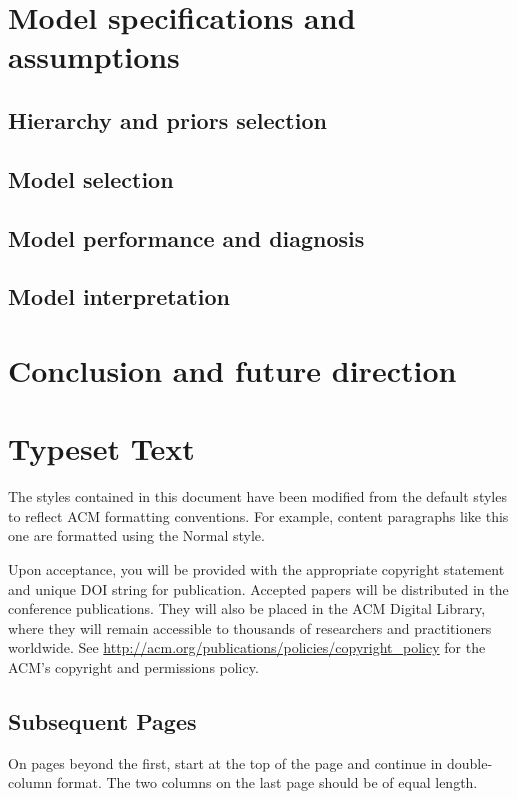 \documentclass{sigchi}
\begin{document}
\section{Model specifications and assumptions}
\subsection{Hierarchy and priors selection}
\subsection{Model selection}
\subsection{Model performance and diagnosis}
\subsection{Model interpretation}


\section{Conclusion and future direction}





\section{Typeset Text}
The styles contained in this document have been modified from the
default styles to reflect ACM formatting conventions. For example,
content paragraphs like this one are formatted using the Normal style.

Upon acceptance, you will be provided with the
appropriate copyright statement and unique DOI string for publication.
Accepted papers will be distributed in the conference
publications. They will also be placed in the ACM Digital Library,
where they will remain accessible to thousands of researchers and
practitioners worldwide. See
\url{http://acm.org/publications/policies/copyright_policy} for the
ACM's copyright and permissions policy.

\subsection{Subsequent Pages}

On pages beyond the first, start at the top of the page and continue
in double-column format.  The two columns on the last page should be
of equal length.
\end{document}
